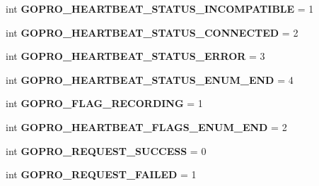 \begin{DoxyCompactItemize}
int {\bfseries G\+O\+P\+R\+O\+\_\+\+H\+E\+A\+R\+T\+B\+E\+A\+T\+\_\+\+S\+T\+A\+T\+U\+S\+\_\+\+I\+N\+C\+O\+M\+P\+A\+T\+I\+B\+LE} = 1
\item 
\mbox{\label{namespacepymavlink_1_1dialects_1_1v10_aea9e323f45d5253398da5d88df4bd385}} 
int {\bfseries G\+O\+P\+R\+O\+\_\+\+H\+E\+A\+R\+T\+B\+E\+A\+T\+\_\+\+S\+T\+A\+T\+U\+S\+\_\+\+C\+O\+N\+N\+E\+C\+T\+ED} = 2
\item 
\mbox{\label{namespacepymavlink_1_1dialects_1_1v10_a7c7864dc51cd204fb840d41eafff20a3}} 
int {\bfseries G\+O\+P\+R\+O\+\_\+\+H\+E\+A\+R\+T\+B\+E\+A\+T\+\_\+\+S\+T\+A\+T\+U\+S\+\_\+\+E\+R\+R\+OR} = 3
\item 
\mbox{\label{namespacepymavlink_1_1dialects_1_1v10_adec85fe06b7b158559ebaaa29268b36b}} 
int {\bfseries G\+O\+P\+R\+O\+\_\+\+H\+E\+A\+R\+T\+B\+E\+A\+T\+\_\+\+S\+T\+A\+T\+U\+S\+\_\+\+E\+N\+U\+M\+\_\+\+E\+ND} = 4
\item 
\mbox{\label{namespacepymavlink_1_1dialects_1_1v10_a4195a36e1fcbd5b6dc9b1df90cef786f}} 
int {\bfseries G\+O\+P\+R\+O\+\_\+\+F\+L\+A\+G\+\_\+\+R\+E\+C\+O\+R\+D\+I\+NG} = 1
\item 
\mbox{\label{namespacepymavlink_1_1dialects_1_1v10_a7588da152cc6113c6505a425ef619a26}} 
int {\bfseries G\+O\+P\+R\+O\+\_\+\+H\+E\+A\+R\+T\+B\+E\+A\+T\+\_\+\+F\+L\+A\+G\+S\+\_\+\+E\+N\+U\+M\+\_\+\+E\+ND} = 2
\item 
\mbox{\label{namespacepymavlink_1_1dialects_1_1v10_ab1d525a41948a39604d7b2612c3caeef}} 
int {\bfseries G\+O\+P\+R\+O\+\_\+\+R\+E\+Q\+U\+E\+S\+T\+\_\+\+S\+U\+C\+C\+E\+SS} = 0
\item 
\mbox{\label{namespacepymavlink_1_1dialects_1_1v10_ae2ebf757df97339e451d33ac96d4ff7c}} 
int {\bfseries G\+O\+P\+R\+O\+\_\+\+R\+E\+Q\+U\+E\+S\+T\+\_\+\+F\+A\+I\+L\+ED} = 1
\item 
\mbox{\label{namespacepymavlink_1_1dialects_1_1v10_adb0403a35907fbf61861e6f12e9f4953}} 

\end{DoxyCompactItemize}
